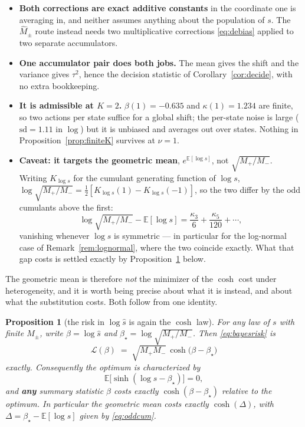 \documentclass[11pt]{article}
\newtheorem{proposition}{Proposition}
\theoremstyle{definition}
\newcommand{\E}{\mathbb{E}}
\begin{document}
\begin{itemize}\itemsep2pt
  \item \textbf{Both corrections are exact additive constants} in the coordinate
  one is averaging in, and neither assumes anything about the population of $s$.
  The $\widehat M_\pm$ route instead needs two multiplicative corrections
  \eqref{eq:debias} applied to two separate accumulators.
  \item \textbf{One accumulator pair does both jobs.} The mean gives the shift
  and the variance gives $\tau^2$, hence the decision statistic of
  Corollary~\ref{cor:decide}, with no extra bookkeeping.
  \item \textbf{It is admissible at $K=2$.} $\beta(1)=-0.635$ and
  $\kappa(1)=1.234$ are finite, so two actions per state suffice for a global
  shift; the per-state noise is large ($\mathrm{sd}=1.11$ in $\log$) but it is
  unbiased and averages out over states. Nothing in
  Proposition~\ref{prop:finiteK} survives at $\nu=1$.
  \item \textbf{Caveat: it targets the geometric mean}, $e^{\E[\log s]}$, not
  $\sqrt{M_+/M_-}$. Writing $K_{\log s}$ for the cumulant generating function of
  $\log s$, $\log\sqrt{M_+/M_-}=\tfrac12[K_{\log s}(1)-K_{\log s}(-1)]$, so the
  two differ by the odd cumulants above the first:
  \begin{equation}
    \log\sqrt{M_+/M_-}-\E[\log s]
    =\frac{\kappa_3}{6}+\frac{\kappa_5}{120}+\cdots,
    \label{eq:oddcum}
  \end{equation}
  vanishing whenever $\log s$ is symmetric --- in particular for the log-normal
  case of Remark~\ref{rem:lognormal}, where the two coincide exactly. What that
  gap costs is settled exactly by Proposition~\ref{prop:selfsim} below.
\end{itemize}

The geometric mean is therefore \emph{not} the minimizer of the $\cosh$ cost
under heterogeneity, and it is worth being precise about what it is instead, and
about what the substitution costs. Both follow from one identity.

\begin{proposition}[the risk in $\log\hat s$ is again the $\cosh$ law]
\label{prop:selfsim}
For any law of $s$ with finite $M_\pm$, write $\beta=\log\hat s$ and
$\beta_\star=\log\sqrt{M_+/M_-}$. Then \eqref{eq:bayesrisk} is
\begin{equation}
  \boxed{\;
  \mathcal L(\beta)\;=\;\sqrt{M_+M_-}\,\cosh\!\big(\beta-\beta_\star\big)
  \;}
  \label{eq:selfsim}
\end{equation}
\emph{exactly}. Consequently the optimum is characterized by
\begin{equation}
  \E\big[\sinh(\log s-\beta_\star)\big]=0,
  \label{eq:sinhbalance}
\end{equation}
and \textbf{any} summary statistic $\beta$ costs exactly $\cosh(\beta-\beta_\star)$
relative to the optimum. In particular the geometric mean costs exactly
$\cosh(\Delta)$, with $\Delta=\beta_\star-\E[\log s]$ given by \eqref{eq:oddcum}.
\end{proposition}
\end{document}
